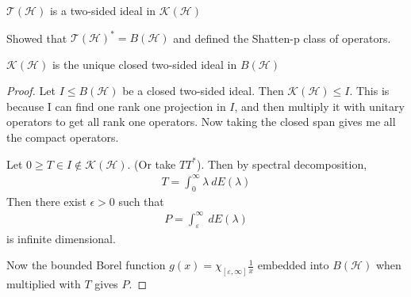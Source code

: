 

$\mathcal{T}(\mathcal{H})$ is a two-sided ideal in $\mathcal{K}(\mathcal{H})$

Showed that $\mathcal{T}(\mathcal{H})^* = B(\mathcal{H})$ and defined
the Shatten-p class of operators.

\begin{theorem}
  $\mathcal{K}(\mathcal{H})$ is the unique closed two-sided ideal in
  $B(\mathcal{H})$
\end{theorem}
\begin{proof}
  Let $I \leqslant B(\mathcal{H})$ be a closed two-sided ideal. Then
  $\mathcal{K}(\mathcal{H}) \leqslant I$. This is because I can find
  one rank one projection in $I$, and then multiply it with unitary
  operators to get all rank one operators. Now taking the closed span
  gives me all the compact operators.

  Let $0 \ge T \in I \notin \mathcal{K}(\mathcal{H})$. (Or take
  $TT^*$). Then by spectral decomposition,
  \begin{align*}
    T = \int_{0}^{\infty}  \lambda \ d E(\lambda)
  \end{align*}
  Then there exist $\epsilon > 0$ such that
  \begin{align*}
    P = \int_{\varepsilon}^{\infty}  \ d E(\lambda)
  \end{align*}
  is infinite dimensional.

  Now the bounded Borel function $g(x) = \chi_{[\varepsilon, \infty]}
  \frac{1}{x}$ embedded into $B(\mathcal{H})$ when multiplied with
  $T$ gives $P$.
\end{proof}
